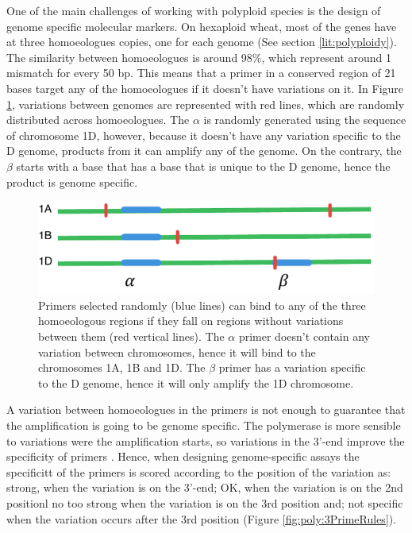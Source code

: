 One of the main challenges of working with polyploid species is the design of genome specific molecular markers. 
On hexaploid wheat, most of the genes have at three homoeologues copies, one for each genome (See section \ref{lit:polyploidy}). 
The similarity between homoeologues is around 98\%, which represent around 1 mismatch for every 50 bp. 
This means that a primer in a conserved region of 21 bases target any of the homoeologues if it doesn't have variations on it.
In Figure \ref{fig:poly:pimerChrSpecificDiagram}, variations between genomes are represented with red lines, which are randomly distributed across homoeologues. 
The $\alpha$ is randomly generated using the sequence of chromosome 1D, however, because it doesn't have any variation specific to the D genome, products from it can amplify any of the genome. 
On the contrary, the $\beta$ starts with a base that has a base that is unique to the D genome, hence the product is genome specific. 

\begin{figure}
\includegraphics[width=1\textwidth]{PolyMarker/Figures/intro/primerChrSpecificDiagram.pdf}
\caption{Primers selected randomly (blue lines) can bind to any of the three homoeologous regions if they fall on regions without variations between them (red vertical lines). The $\alpha$ primer doesn't contain any variation between chromosomes, hence it will bind to the chromosomes 1A, 1B and 1D. The $\beta$ primer has a variation specific to the D genome, hence it will only amplify the 1D chromosome.}
\label{fig:poly:pimerChrSpecificDiagram}
\end{figure}

A variation between homoeologues in the primers is not enough to guarantee that the amplification is going to be genome specific. 
The polymerase is more sensible to variations were the amplification starts, so variations in the 3'-end improve the specificity of primers \citep{Huang2010}. 
Hence, when designing genome-specific assays the specificitt of the primers is scored according to the position of the variation as:  strong, when the variation is on the 3'-end; OK, when the variation is on the 2nd positionl no too strong when the variation is on the 3rd position and; not specific when the variation occurs after the 3rd position (Figure \ref{fig:poly:3PrimeRules}).  

